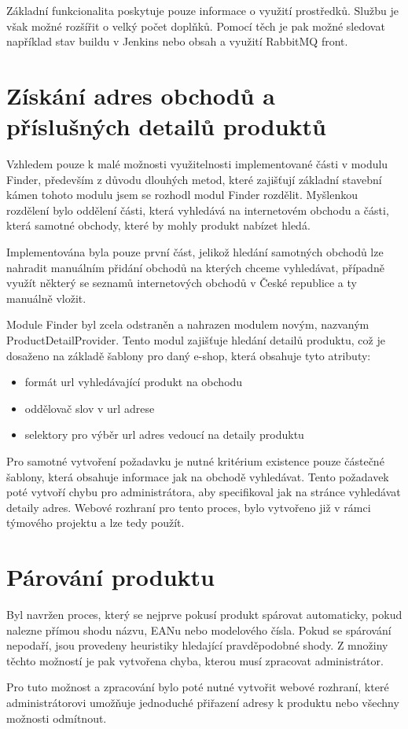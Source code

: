 \documentclass[thesis=B,czech]{FITthesis}[2012/06/26]
\begin{document}
Základní funkcionalita poskytuje pouze informace o využití prostředků. Službu je však možné rozšířit o velký počet doplňků. Pomocí těch je pak možné sledovat
například stav buildu v Jenkins nebo obsah a využití RabbitMQ front.


\section{Získání adres obchodů a příslušných detailů produktů}
Vzhledem pouze k malé možnosti využitelnosti implementované části v modulu Finder, především z důvodu dlouhých metod, které zajišťují
základní stavební kámen tohoto modulu jsem se rozhodl modul Finder rozdělit. Myšlenkou rozdělení bylo oddělení části, která vyhledává na internetovém obchodu a části, která samotné obchody, které by mohly produkt nabízet hledá. 
\par
Implementována byla pouze první část, jelikož hledání samotných obchodů lze nahradit manuálním přidání obchodů na kterých chceme vyhledávat, případně 
využít některý se seznamů internetových obchodů v České republice a ty manuálně vložit.
\par
Module Finder byl zcela odstraněn a nahrazen modulem novým, nazvaným ProductDetailProvider.
Tento modul zajišťuje hledání detailů produktu, což je dosaženo na základě šablony pro daný e-shop, která obsahuje 
tyto atributy:
\begin{itemize}
\item formát url vyhledávající produkt na obchodu
\item oddělovač slov v url adrese
\item selektory pro výběr url adres vedoucí na detaily produktu
\end{itemize}
Pro samotné vytvoření požadavku je nutné kritérium existence pouze částečné šablony, která obsahuje informace jak na obchodě vyhledávat.
Tento požadavek poté vytvoří chybu pro administrátora, aby specifikoval jak na stránce vyhledávat detaily adres. Webové rozhraní
pro tento proces, bylo vytvořeno již v rámci týmového projektu a lze tedy použít.


\section{Párování produktu}
Byl navržen proces, který se nejprve pokusí produkt spárovat automaticky, pokud nalezne přímou shodu názvu, EANu nebo modelového čísla.
Pokud se spárování nepodaří, jsou provedeny heuristiky hledající pravděpodobné shody. Z množiny těchto možností je pak 
vytvořena chyba, kterou musí zpracovat administrátor.
\par
Pro tuto možnost a zpracování bylo poté nutné vytvořit webové rozhraní, které administrátorovi umožňuje jednoduché přiřazení 
adresy k produktu nebo všechny možnosti odmítnout.
\end{document}

